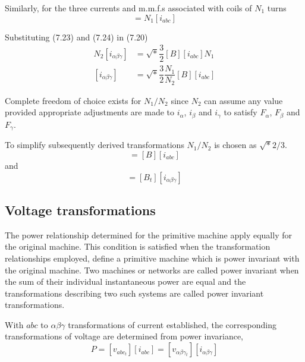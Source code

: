 \documentclass[a4paper,numbers=noenddot,12pt]{scrbook}
\begin{document}
    Similarly, for the three currents and m.m.f.s associated with coils of $N_1$ turns
    \begin{equation}
        [F_{abc}] = N_1 [i_{abc}]
        \label{eq:Eq7.24}
    \end{equation}

    Substituting (7.23) and (7.24)  in (7.20)
    \begin{align}
        N_2[i_{\alpha \beta \gamma}] & = \sqrt*{\dfrac{3}{2}} [B] [i_{abc}] N_1 \nonumber \\
        [i_{\alpha \beta \gamma}] & = \sqrt*{\dfrac{3}{2}} \dfrac{N_1}{N_2} [B] [i_{abc}]
        \label{eq:Eq7.25}
    \end{align}

    Complete freedom of choice exists for $N_1 / N_2$ since $N_2$ can assume any value provided appropriate adjustments are made to $i_{\alpha}$, $i_{\beta}$ and $i_{\gamma}$ to satisfy $F_{\alpha}$, $F_{\beta}$ and $F_{\gamma}$.

    To simplify subsequently derived transformations $N_1 / N_2$ is chosen as $\sqrt*{2/3}$.
    \begin{equation}
        [i_{\alpha \beta \gamma}] = [B][i_{abc}]
        \label{eq:Eq7.26}
    \end{equation}
    and
    \begin{equation}
        [i_{abc}] = [B_t] [i_{\alpha \beta \gamma}]
        \label{eq:Eq7.27}
    \end{equation}

    \subsection{Voltage transformations} The power relationship determined  for the primitive machine apply equally for the original machine. This condition is satisfied when the transformation relationships employed, define a primitive machine which is power invariant with the original machine. Two machines or networks are called power invariant when the sum of their individual instantaneous power are equal and the transformations describing two such systems are called power
    invariant transformations.

    With $abc$ to $\alpha \beta \gamma$ transformations of current established, the corresponding transformations of voltage are determined from power invariance,
    \begin{equation}
        P = [v_{abc_{t}}][i_{abc}] = [v_{\alpha \beta \gamma_{t}}][i_{\alpha \beta \gamma}]
        \label{eq:Eq7.28}
    \end{equation}
\end{document}
